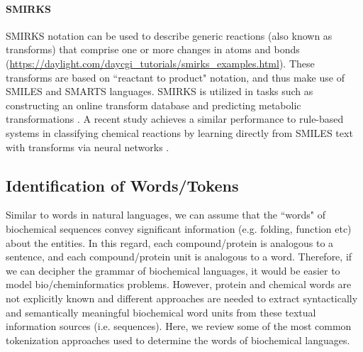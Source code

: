 \documentclass[review]{elsarticle}
\begin{document}
\paragraph{SMIRKS} SMIRKS notation can be used to describe generic reactions (also known as transforms) that comprise one or more changes in atoms and bonds (\url{https://daylight.com/daycgi\_tutorials/smirks\_examples.html}). These transforms are based on ``reactant to product" notation, and thus make use of SMILES and SMARTS languages. SMIRKS is utilized in tasks such as constructing an online transform database \cite{avramova2018retrotransformdb} and predicting metabolic transformations \cite{arvidsson2017prediction}. A recent study achieves a similar performance to rule-based systems in classifying chemical reactions by learning directly from SMILES text with transforms via neural networks  \cite{schwaller2019data}.



\subsection{Identification of Words/Tokens} \label{subsection:words}

Similar to  words in natural languages, we can assume that the ``words" of  biochemical sequences convey significant information (e.g. folding, function etc) about the entities. In this regard, each compound/protein is analogous to a sentence, and each compound/protein unit is analogous to a word. Therefore, if we can decipher the grammar of biochemical languages, it would be easier to model bio/cheminformatics problems. However,  protein and chemical words are not explicitly known and different approaches are needed to extract syntactically and semantically meaningful biochemical word units from these textual information sources (i.e. sequences). Here, we review some of the most common tokenization approaches used to determine the words of biochemical languages.
\end{document}
